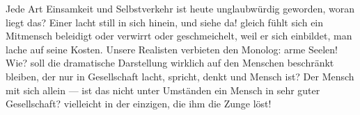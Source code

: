 Jede Art Einsamkeit und Selbstverkehr ist heute unglaubwürdig geworden, woran liegt das? Einer lacht still in sich hinein, und siehe da! gleich fühlt sich ein Mitmensch beleidigt oder verwirrt oder geschmeichelt, weil er sich einbildet, man lache auf seine Kosten. Unsere Realisten verbieten den Monolog: arme Seelen! Wie? soll die dramatische Darstellung wirklich auf den Menschen beschränkt bleiben, der nur in Gesellschaft lacht, spricht, denkt und Mensch ist? Der Mensch mit sich allein — ist das nicht unter Umständen ein Mensch in sehr guter Gesellschaft? vielleicht in der einzigen, die ihm die Zunge löst!
\par

